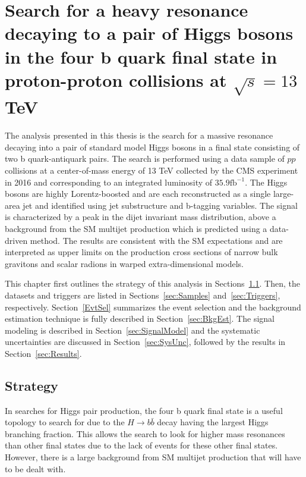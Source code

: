\chapter{Search for a heavy resonance decaying to a pair of Higgs bosons in the four b quark final state in proton-proton collisions at $\sqrt{s}=13$ TeV}
\label{ch:Analysis}

The analysis presented in this thesis is the search for a massive resonance decaying into a pair of standard model Higgs bosons in a final state consisting of two b quark-antiquark pairs. The search is performed using a data sample of $pp$ collisions at a center-of-mass energy of 13 TeV collected by the CMS experiment in 2016 and corresponding to an integrated luminosity of $35.9\mathrm{fb}^{-1}$. The Higgs bosons are highly Lorentz-boosted and are each reconstructed as a single large-area jet and identified using jet substructure and b-tagging variables. The signal is characterized by a peak in the dijet invariant mass distribution, above a background from the SM multijet production which is predicted using a data-driven method. The results are consistent with the SM expectations and are interpreted as upper limits on the production cross sections of narrow bulk gravitons and scalar radions in warped extra-dimensional models. 

This chapter first outlines the strategy of this analysis in Sections~\ref{sec:Strat}. Then, the datasets and triggers are listed in Sections~\ref{sec:Samples} and~\ref{sec:Triggers}, respectively. Section~\ref{EvtSel} summarizes the event selection and the background estimation technique is fully described in Section~\ref{sec:BkgEst}. The signal modeling is described in Section~\ref{sec:SignalModel} and the systematic uncertainties are discussed in Section~\ref{sec:SysUnc}, followed by the results in Section~\ref{sec:Results}.

\section{Strategy}
\label{sec:Strat}

In searches for Higgs pair production, the four b quark final state is a useful topology to search for due to the $H\rightarrow b\bar{b}$ decay having the largest Higgs branching fraction. This allows the search to look for higher mass resonances than other final states due to the lack of events for these other final states. However, there is a large background from SM multijet production that will have to be dealt with. 

